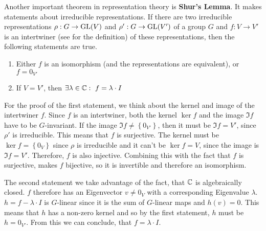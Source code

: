 Another important theorem in representation theory is \textbf{Shur's Lemma}.
It makes statements about irreducible representations.
If there are two irreducible representations $\rho: G \to \operatorname{GL}(V)$ and $\rho': G \to \operatorname{GL}(V')$ of a group $G$ and $f: V \to V'$ is an intertwiner (see  for the definition) of these representations, then the following statements are true.
\begin{enumerate}
    \item Either $f$ is an isomorphism (and the representations are equivalent), or $f = 0_{V'}$
    \item If $V = V'$, then $\exists \lambda \in \mathbb{C}:\ f = \lambda \cdot I$
\end{enumerate}
For the proof of the first statement, we think about the kernel and image of the intertwiner $f$.
Since $f$ is an intertwiner, both the kernel $\ker f$ and the image $\Im f$ have to be $G$-invariant.
If the image $\Im f \neq \left\{ 0_{V'} \right\}$, then it must be $\Im f = V'$, since $\rho'$ is irreducible.
This means that $f$ is surjective.
The kernel must be $\ker f = \left\{ 0_V \right\}$ since $\rho$ is irreducible and it can't be $\ker f = V$, since the image is $\Im f = V'$.
Therefore, $f$ is also injective.
Combining this with the fact that $f$ is surjective, makes $f$ bijective, so it is invertible and therefore an isomorphism.

The second statement we take advantage of the fact, that $\mathbb{C}$ is algebraically closed.
$f$ therefore has an Eigenvector $v \neq 0_V$ with a corresponding Eigenvalue $\lambda$.
$h = f - \lambda \cdot I$ is $G$-linear since it is the sum of $G$-linear maps and $h(v) = 0$.
This means that $h$ has a non-zero kernel and so by the first statement, $h$ must be $h = 0_{V'}$.
From this we can conclude, that $f = \lambda \cdot I$.


